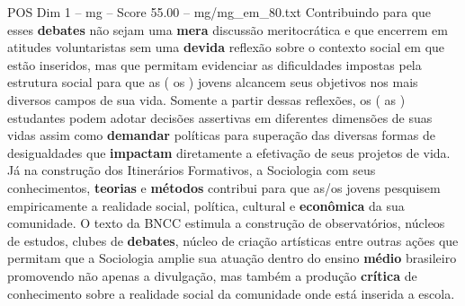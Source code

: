 \begin{textsample}{POS Dim 1 – mg – Score 55.00 – mg/mg\_em\_80.txt}
Contribuindo para que esses \textbf{debates} não sejam uma \textbf{mera} discussão meritocrática e que encerrem em atitudes voluntaristas sem uma \textbf{devida} reflexão sobre o contexto social em que estão inseridos, mas que permitam evidenciar as dificuldades impostas pela estrutura social para que as ( os ) jovens alcancem seus objetivos nos mais diversos campos de sua vida.
Somente a partir dessas reflexões, os ( as ) estudantes podem adotar decisões assertivas em diferentes dimensões de suas vidas assim como \textbf{demandar} políticas para superação das diversas formas de desigualdades que \textbf{impactam} diretamente a efetivação de seus projetos de vida.
Já na construção dos Itinerários Formativos, a Sociologia com seus conhecimentos, \textbf{teorias} e \textbf{métodos} contribui para que as/os jovens pesquisem empiricamente a realidade social, política, cultural e \textbf{econômica} da sua comunidade.
O texto da BNCC estimula a construção de observatórios, núcleos de estudos, clubes de \textbf{debates}, núcleo de criação artísticas entre outras ações que permitam que a Sociologia amplie sua atuação dentro do ensino \textbf{médio} brasileiro promovendo não apenas a divulgação, mas também a produção \textbf{crítica} de conhecimento sobre a realidade social da comunidade onde está inserida a escola.

\end{textsample}
